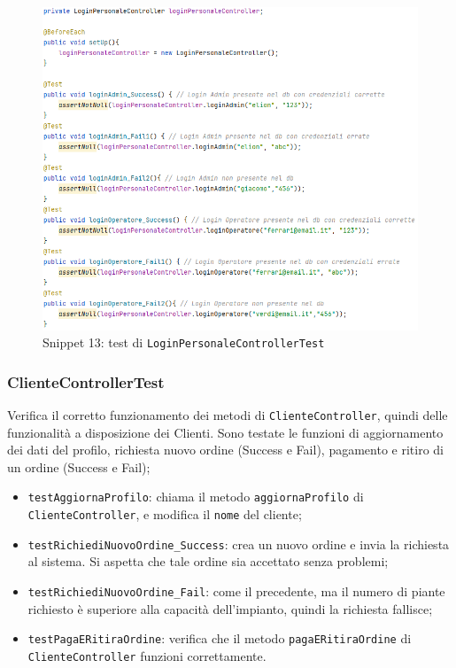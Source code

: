 \documentclass{article}
\newcommand{\code}[1]{\texttt{#1}}
\begin{document}
\begin{figure}[H]
    \centering
    \includegraphics[scale=0.5]{resources/images/Snippets/snippet_LoginPersonaleControllerTest.png}
    \captionsetup{labelformat=empty,labelsep=none}
    \caption{Snippet 13: test di \code{LoginPersonaleControllerTest}}
    \label{fig:snippet_LoginPersonaleControllerTest}
\end{figure}

\subsubsection{ClienteControllerTest}
Verifica il corretto funzionamento dei metodi di \code{ClienteController}, quindi delle funzionalità a disposizione dei Clienti. Sono testate le funzioni di aggiornamento dei dati del profilo, richiesta nuovo ordine (Success e Fail), pagamento e ritiro di un ordine (Success e Fail);
\begin{itemize}
    \item \code{testAggiornaProfilo}: chiama il metodo \code{aggiornaProfilo} di \code{ClienteController}, e modifica il \code{nome} del cliente;
    \item \code{testRichiediNuovoOrdine\_Success}: crea un nuovo ordine e invia la richiesta al sistema. Si aspetta che tale ordine sia accettato senza problemi;
    \item \code{testRichiediNuovoOrdine\_Fail}: come il precedente, ma il numero di piante richiesto è superiore alla capacità dell'impianto, quindi la richiesta fallisce;
    \item \code{testPagaERitiraOrdine}: verifica che il metodo \code{pagaERitiraOrdine} di \code{ClienteController} funzioni correttamente.
\end{itemize}
\end{document}
